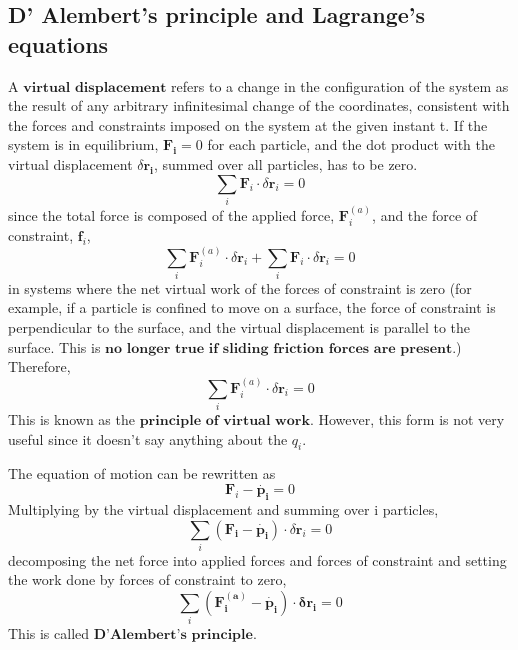 \documentclass[]{article}
\numberwithin{equation}{section}
\begin{document}
\subsection{D' Alembert's principle and Lagrange's equations}
A $\textbf{virtual displacement}$ refers to a change in the configuration of the system as the result of any arbitrary infinitesimal change of the coordinates, consistent with the forces and constraints imposed on the system at the given instant t. If the system is in equilibrium, $\mathbf{F_i}=0$ for each particle, and the dot product with  the virtual displacement $\delta\mathbf{r_i}$, summed over all particles, has to be zero.
$$\sum_i\mathbf F_i\cdot\delta\mathbf r_i=0$$
since the total force is composed of the applied force, $\mathbf F_i^{(a)}$, and the force of constraint, $\mathbf f_i$,
$$\sum_i\mathbf F_i^{(a)}\cdot\delta\mathbf r_i+\sum_i\mathbf F_i\cdot\delta\mathbf r_i=0$$
in systems where the net virtual work of the forces of constraint is zero (for example, if a particle is confined to move on a surface, the force of constraint is perpendicular to the surface, and the virtual displacement is parallel to the surface. This is $\textbf{no longer true if sliding friction forces are present}$.) Therefore,
\begin{equation}\sum_i\mathbf F_i^{(a)}\cdot\delta\mathbf r_i=0\end{equation}
This is known as the $\textbf{principle of virtual work}$. However, this form is not very useful since it doesn't say anything about the $q_i$. 

The equation of motion can be rewritten as 
$$\mathbf F_i-\dot{\mathbf{p_i}}=0$$
Multiplying by the virtual displacement and summing over i particles,
$$\sum_i\mathbf{(F_i-\dot{p_i})}\cdot\delta\mathbf r_i=0$$
decomposing the net force into applied forces and forces of constraint and setting the work done by forces of constraint to zero, 
\begin{equation}\sum_i\mathbf{(F_i^{(a)}-\dot{p_i})\cdot\delta\mathbf r_i}=0\end{equation}
This is called $\textbf{D'Alembert's principle}$. 
\end{document}
